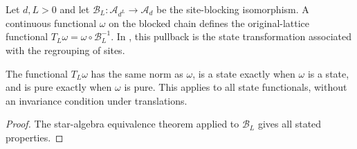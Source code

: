 \begin{definition}
    \label{def:qca_blocking_functional}
    \leanok
    Let $d,L>0$ and let
    $\mathcal B_L:\mathcal A_{d^L}\to\mathcal A_d$ be the site-blocking
    isomorphism. A continuous functional $\omega$ on the blocked chain
    defines the original-lattice functional
    $T_L\omega=\omega\circ\mathcal B_L^{-1}$.
    In \cite[lines~825--836]{Nachtergaele1996Spectral}, this pullback is the state transformation associated with the regrouping of
    sites.
\end{definition}

\begin{lemma}
    \label{thm:qca_blocking_state_purity}
    \leanok
    The functional $T_L\omega$ has the same norm as $\omega$, is a state
    exactly when $\omega$ is a state, and is pure exactly when $\omega$ is
    pure. This applies to all state functionals, without an invariance
    condition under translations.
\end{lemma}
\begin{proof}\leanok
    The star-algebra equivalence theorem applied to $\mathcal B_L$ gives all stated properties.
\end{proof}
